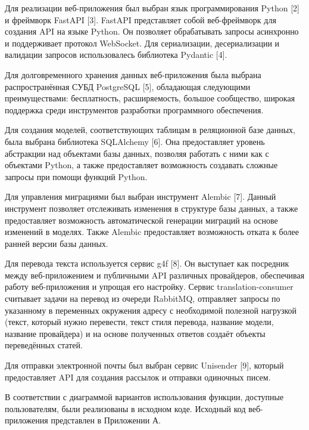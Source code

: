 \clearpage
{}

Для реализации веб-приложения был выбран язык программирования Python [2] и фреймворк FastAPI [3]. FastAPI представляет собой веб-фреймворк для создания API на языке Python. Он позволяет обрабатывать запросы асинхронно и поддерживает протокол WebSocket. Для сериализации, десериализации и валидации запросов использовалесь библиотека Pydantic [4].

Для долговременного хранения данных веб-приложения была выбрана распространённая СУБД PostgreSQL [5], обладающая следующими преимуществами: бесплатность, расширяемость, большое сообщество, широкая поддержка среди инструментов разработки программного обеспечения.

Для создания моделей, соответствующих таблицам в реляционной базе данных, была выбрана библиотека SQLAlchemy [6]. Она предоставляет уровень абстракции над объектами базы данных, позволяя работать с ними как с объектами Python, а также предоставляет возможность создавать сложные запросы при помощи функций Python.

Для управления миграциями был выбран инструмент Alembic [7]. Данный инструмент позволяет отслеживать изменения в структуре базы данных, а также предоставляет возможность автоматической генерации миграций на основе изменений в моделях. Также Alembic предоставляет возможность отката к более ранней версии базы данных.

Для перевода текста используется сервис g4f [8]. Он выступает как посредник между веб-приложением и публичными API различных провайдеров, обеспечивая работу веб-приложения и упрощая его настройку. Сервис translation-consumer считывает задачи на перевод из очереди RabbitMQ, отправляет запросы по указанному в переменных окружения адресу с необходимой полезной нагрузкой (текст, который нужно перевести, текст стиля перевода, название модели, название провайдера) и на основе полученных ответов создаёт объекты переведённых статей. 

Для отправки электронной почты был выбран сервис Unisender [9], который предоставляет API для создания рассылок и отправки одиночных писем.


В соответствии с диаграммой вариантов использования функции, доступные пользователям, были реализованы в исходном коде. Исходный код веб-приложения представлен в Приложении А.


